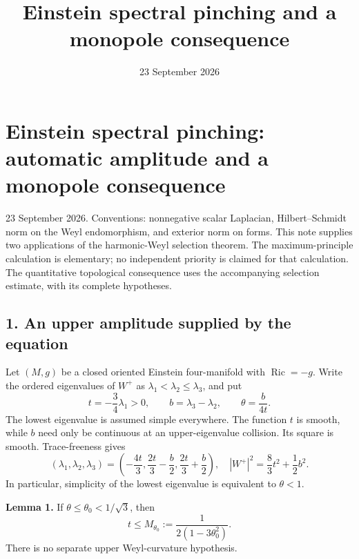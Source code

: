 \documentclass[
  11pt,
]{article}
\title{Einstein spectral pinching and a monopole consequence}
\author{}
\date{23 September 2026}
\begin{document}
\maketitle

\hypertarget{einstein-spectral-pinching-automatic-amplitude-and-a-monopole-consequence}{%
\section{Einstein spectral pinching: automatic amplitude and a monopole
consequence}\label{einstein-spectral-pinching-automatic-amplitude-and-a-monopole-consequence}}

23 September 2026. Conventions: nonnegative scalar Laplacian,
Hilbert--Schmidt norm on the Weyl endomorphism, and exterior norm on
forms. This note supplies two applications of the harmonic-Weyl
selection theorem. The maximum-principle calculation is elementary; no
independent priority is claimed for that calculation. The quantitative
topological consequence uses the accompanying selection estimate, with
its complete hypotheses.

\hypertarget{an-upper-amplitude-supplied-by-the-equation}{%
\subsection{1. An upper amplitude supplied by the
equation}\label{an-upper-amplitude-supplied-by-the-equation}}

Let \((M,g)\) be a closed oriented Einstein four-manifold with
\(\operatorname{Ric}=-g\). Write the ordered eigenvalues of \(W^+\) as
\(\lambda_1<\lambda_2\le\lambda_3\), and put \[
 t=-\frac34\lambda_1>0,\qquad b=\lambda_3-\lambda_2,\qquad
 \theta=\frac{b}{4t}.
\tag{1}
\] The lowest eigenvalue is assumed simple everywhere. The function
\(t\) is smooth, while \(b\) need only be continuous at an
upper-eigenvalue collision. Its square is smooth. Trace-freeness gives
\[
 (\lambda_1,\lambda_2,\lambda_3)
 =\left(-\frac{4t}{3},\frac{2t}{3}-\frac b2,
                         \frac{2t}{3}+\frac b2\right),
 \quad |W^+|^2=\frac83t^2+\frac12b^2.
\tag{2}
\] In particular, simplicity of the lowest eigenvalue is equivalent to
\(\theta<1\).

\textbf{Lemma 1.} If \(\theta\le\theta_0<1/\sqrt3\), then \[
 \boxed{t\le M_{\theta_0}:=\frac{1}{2(1-3\theta_0^2)}.}
\tag{3}
\] There is no separate upper Weyl-curvature hypothesis.
\end{document}

